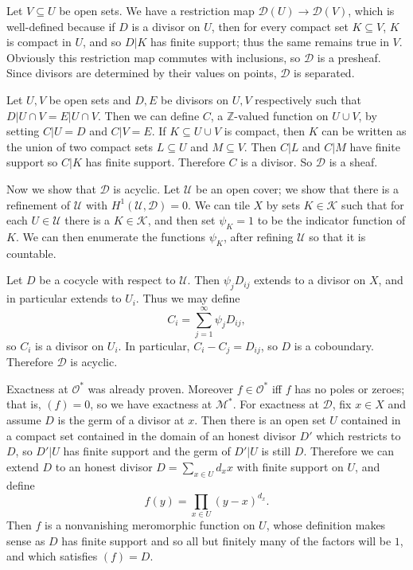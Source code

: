 \documentclass[10pt]{article}
\newcommand{\ZZ}{\mathbb{Z}}
\newcommand{\Mero}{\mathscr M}
\newcommand{\Olo}{\mathscr O}
\theoremstyle{definition}
\begin{document}
Let $V \subseteq U$ be open sets.
We have a restriction map $\mathscr D(U) \to \mathscr D(V)$, which is well-defined because if $D$ is a divisor on $U$, then for every compact set $K \subseteq V$, $K$ is compact in $U$, and so $D|K$ has finite support; thus the same remains true in $V$.
Obviously this restriction map commutes with inclusions, so $\mathscr D$ is a presheaf.
Since divisors are determined by their values on points, $\mathscr D$ is separated.

Let $U, V$ be open sets and $D, E$ be divisors on $U, V$ respectively such that $D|U \cap V = E|U \cap V$.
Then we can define $C$, a $\ZZ$-valued function on $U \cup V$, by setting $C|U = D$ and $C|V = E$.
If $K \subseteq U \cup V$ is compact, then $K$ can be written as the union of two compact sets $L \subseteq U$ and $M \subseteq V$.
Then $C|L$ and $C|M$ have finite support so $C|K$ has finite support.
Therefore $C$ is a divisor. So $\mathscr D$ is a sheaf.

Now we show that $\mathscr D$ is acyclic.
Let $\mathcal U$ be an open cover; we show that there is a refinement of $\mathcal U$ with $H^1(\mathcal U, \mathscr D) = 0$.
We can tile $X$ by sets $K \in \mathcal K$ such that for each $U \in \mathcal U$ there is a $K \in \mathcal K$, and then set $\psi_K = 1$ to be the indicator function of $K$.
We can then enumerate the functions $\psi_K$, after refining $\mathcal U$ so that it is countable.

Let $D$ be a cocycle with respect to $\mathcal U$.
Then $\psi_j D_{ij}$ extends to a divisor on $X$, and in particular extends to $U_i$.
Thus we may define
$$C_i = \sum_{j=1}^\infty \psi_j D_{ij},$$
so $C_i$ is a divisor on $U_i$.
In particular, $C_i - C_j = D_{ij}$, so $D$ is a coboundary.
Therefore $\mathscr D$ is acyclic.

Exactness at $\Olo^*$ was already proven.
Moreover $f \in \Olo^*$ iff $f$ has no poles or zeroes; that is, $(f) = 0$, so we have exactness at $\Mero^*$.
For exactness at $\mathscr D$, fix $x \in X$ and assume $D$ is the germ of a divisor at $x$.
Then there is an open set $U$ contained in a compact set contained in the domain of an honest divisor $D'$ which restricts to $D$, so $D'|U$ has finite support and the germ of $D'|U$ is still $D$.
Therefore we can extend $D$ to an honest divisor $D = \sum_{x \in U} d_x x$ with finite support on $U$, and define
$$f(y) = \prod_{x \in U} (y - x)^{d_x}.$$
Then $f$ is a nonvanishing meromorphic function on $U$, whose definition makes sense as $D$ has finite support and so all but finitely many of the factors will be $1$, and which satisfies $(f) = D$.
\end{document}
